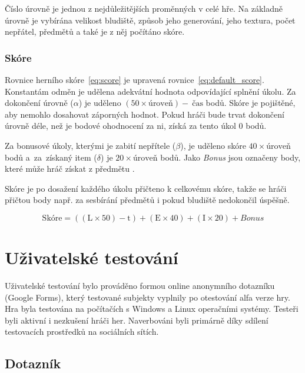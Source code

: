 Číslo úrovně je jednou z nejdůležitějších proměnných v celé hře. Na základně úrovně je vybírána velikost bludiště, způsob jeho generování, jeho textura, počet nepřátel, předmětů a také je z něj počítáno skóre.

\subsection*{Skóre}
Rovnice herního skóre~\ref{eq:score} je upravená rovnice~\ref{eq:default_score}. Konstantám odměn je udělena adekvátní hodnota odpovídající splnění úkolu. Za dokončení úrovně ($\alpha$) je uděleno $(50 \times\text{úroveň}) -~\text{čas}$ bodů. Skóre je pojištěné, aby nemohlo dosahovat záporných hodnot. Pokud hráči bude trvat dokončení úrovně déle, než je bodové ohodnocení za ni, získá za tento úkol 0 bodů.

Za bonusové úkoly, kterými je zabití nepřítele ($\beta$), je uděleno skóre $40 \times \text{úroveň}$ bodů a~za~získaný item ($\delta$) je $20 \times \text{úroveň}$ bodů. Jako \textit{Bonus} jsou označeny body, které může hráč získat z předmětu .

Skóre je po dosažení každého úkolu přičteno k celkovému skóre, takže se hráči přičtou body např. za sesbírání předmětů i pokud bludiště nedokončil úspěšně.

\begin{equation}
    \text{Skóre} = ((\text{L} \times 50) - \text{t}) + (\text{E} \times 40) + (\text{I} \times 20) + \textit{Bonus}
    \label{eq:score}
\end{equation}

\chapter{Uživatelské testování}\label{chap:Uživatelské testování}
Uživatelské testování bylo prováděno formou online anonymního dotazníku (Google Forms), který testované subjekty vyplnily po otestování alfa verze hry. Hra byla testována na počítačích s Windows a Linux operačními systémy. Testeři byli aktivní i nezkušení hráči her. Naverbováni byli primárně díky sdílení testovacích prostředků na sociálních sítích.
\section{Dotazník}

